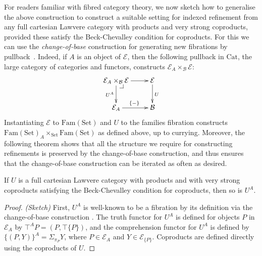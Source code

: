 \documentclass{LMCS}
\makeatletter
\newcommand{\Fam}{\mathrm{Fam}}
\newcommand{\Set}{\mathrm{Set}}
\newcommand{\pullbackcorner}[1][dr]{\save*!/#1-1.2pc/#1:(-1,1)@^{|-}\restore}
\makeatother
\begin{document}
\vspace*{0.1in}

For readers familiar with fibred category theory, we now sketch how to
generalise the above construction to construct a suitable setting for
indexed refinement from any full cartesian Lawvere category with
products and very strong coproducts, provided these satisfy the
Beck-Chevalley condition for coproducts. For this we can use the
\emph{change-of-base} construction for generating new fibrations by
pullback~\cite{jacobs99book}. Indeed, if $A$ is an object of
$\mathcal E$, then the following pullback in $\mathrm{Cat}$, the large
category of categories and functors, constructs ${\mathcal E}_A
\times_{\mathcal B} {\mathcal E}$:
\begin{displaymath}
  \xymatrix{
    {{\mathcal E}_A \times_{\mathcal B} {\mathcal E}} \ar[r] \ar[d]_{U^A}
    \pullbackcorner
    &
    {\mathcal E} \ar[d]^U
    \\
    {{\mathcal E}_A} \ar[r]^{\{-\}}
    &
    {\mathcal B}
  }
\end{displaymath}
\noindent
Instantiating $\mathcal E$ to $\Fam(\Set)$ and $U$ to the families
fibration constructs $\Fam(\Set)_A \times_{\Set} \Fam(\Set)$ as
defined above, up to currying. Moreover, the following theorem shows
that all the structure we require for constructing refinements is
preserved by the change-of-base construction, and thus ensures that
the change-of-base construction can be iterated as often as desired.

\begin{thm}\label{thm:change-of-base}
  If $U$ is a full cartesian Lawvere category with products and with
  very strong coproducts satisfying the Beck-Chevalley condition for
  coproducts, then so is $U^A$.
\end{thm}

\begin{proof}\emph{(Sketch)}
  First, $U^A$ is well-known to be a fibration by its definition via
  the change-of-base construction \cite{jacobs99book}. The truth
  functor for $U^A$ is defined for objects $P$ in $\mathcal{E}_A$ by
  $\top^AP = (P, \top\{P\})$, and the comprehension functor for $U^A$
  is defined by $\{(P,Y)\}^A = \Sigma_{\pi_{P}}Y$, where $P \in
  \mathcal{E}_A$ and $Y \in \mathcal{E}_{\{P\}}$. Coproducts are
  defined directly using the coproducts of $U$.
\end{proof}
\end{document}
